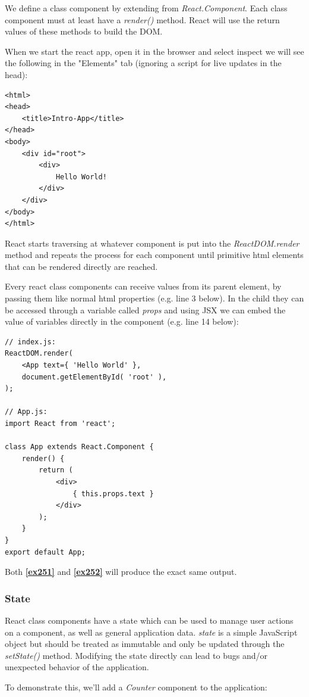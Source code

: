 We define a class component by extending from \emph{React.Component}. Each class component must at least have a \emph{render()} method. React will use the return values of these methods to build the DOM.

When we start the react app, open it in the browser and select inspect we will see the following in the "Elements" tab (ignoring a script for live updates in the head):

\begin{lstlisting}
<html> 
<head>
	<title>Intro-App</title>
</head>
<body>
	<div id="root">
		<div>
			Hello World!
		</div>
	</div>
</body>
</html>
\end{lstlisting}

React starts traversing at whatever component is put into the \emph{ReactDOM.render} method and repeats the process for each component until primitive html elements that can be rendered directly are reached.

Every react class components can receive values from its parent element, by passing them like normal html properties (e.g. line 3 below). In the child they can be accessed through a variable called \emph{props} and using JSX we can embed the value of variables directly in the component (e.g. line 14 below):

\begin{lstlisting}[caption={Using Props},label={ex252}]
// index.js:
ReactDOM.render(
	<App text={ 'Hello World' },
	document.getElementById( 'root' ),
);

// App.js:
import React from 'react';

class App extends React.Component {
	render() {
		return (
			<div>
				{ this.props.text }
			</div>
		);
	}
}
export default App;
\end{lstlisting}
Both \textbf{\ref{ex251}} and \textbf{\ref{ex252}} will produce the exact same output.

\subsubsection{State}
React class components have a state which can be used to manage user actions on a component, as well as general application data. \emph{state} is a simple JavaScript object but should be treated as immutable and only be updated through the \emph{setState()} method. Modifying the state directly can lead to bugs and/or unexpected behavior of the application.

To demonstrate this, we'll add a \emph{Counter} component to the application:

